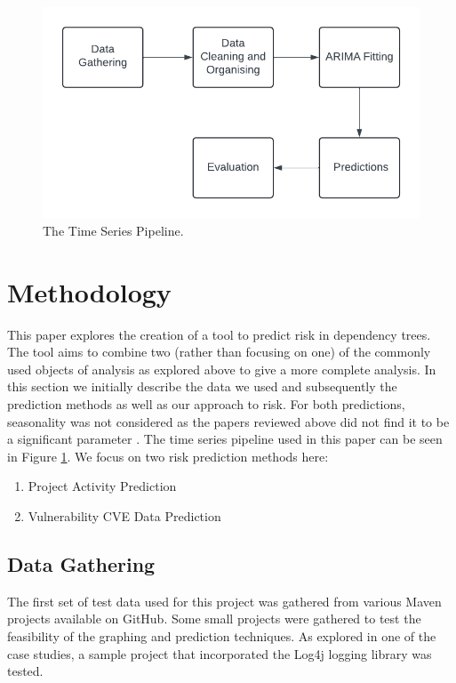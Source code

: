 \documentclass[conference]{IEEEtran}
\begin{document}
\begin{figure}
\begin{center}
    \includegraphics[scale=0.5]{Pipeline.png}
    \caption{The Time Series Pipeline.}
    \label{fig:pipeline}
\end{center}
\end{figure}

\section{Methodology}
This paper explores the creation of a tool to predict risk in dependency trees. The tool aims to combine two (rather than focusing on one) of the commonly used objects of analysis as explored above to give a more complete analysis. In this section we initially describe the data we used and subsequently the prediction methods as well as our approach to risk. For both predictions, seasonality was not considered as the papers reviewed above did not find it to be a significant parameter \cite{roumani_time_2015}. The time series pipeline used in this paper can be seen in Figure \ref{fig:pipeline}. We focus on two risk prediction methods here: 

\begin{enumerate}
    \item Project Activity Prediction
    \item Vulnerability CVE Data Prediction
\end{enumerate}

\subsection{Data Gathering}
The first set of test data used for this project was gathered from various Maven projects available on GitHub. Some small projects were gathered to test the feasibility of the graphing and prediction techniques. As explored in one of the case studies, a sample project that incorporated the Log4j logging library was tested. 
\end{document}

